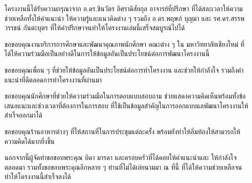\iffalse
\begin{dedication}
This document is dedicated to all Chiang Mai University students.

Dedication page is optional.
\end{dedication}
\fi %

\begin{acknowledgments}
โครงงานนี้ได้รับความกรุณาจาก อ.ดร.ชินวัตร อิศราดิสัยกุล อาจารย์ที่ปรึกษา ที่ได้สละเวลาให้ความช่วยเหลือทั้งให้คำแนะนำ ให้ความรู้และแนวคิดต่าง ๆ รวมถึง อ.ดร.พฤษภ์ บุญมา และ รศ.ดร.สรรพวรรธน์ กันตะบุตร ที่ให้คำปรึกษาจนทำให้โครงงานเล่มนี้เสร็จสมบูรณ์ไปได้
    
ขอขอบคุณงานบริการการศึกษาและพัฒนาคุณภาพนักศึกษา คณะต่าง ๆ ใน มหาวิทยาลัยเชียงใหม่ ที่ได้ให้ความร่วมมือเป็นอย่างดีในการให้ข้อมูลอันเป็นประโยชน์ต่อการพัฒนาโครงงานนี้

ขอขอบคุณเพื่อน ๆ ที่ช่วยให้ข้อมูลอันเป็นประโยชน์ต่อการทำโครงงาน และช่วยให้กำลังใจ รวมถึงคำแนะนำที่ดีตลอดการทำโครงงานที่ผ่านมา

ขอขอบคุณนักศึกษาที่ช่วยให้ความร่วมมือในการตอบแบบสอบถาม ช่วยแสดงความคิดเห็นพร้อมทั้งข้อเสนอแนะและช่วงเวลาที่ต้องการในการสอบ ที่ใช้เป็นข้อมูลสำคัญในการออกแบบแลพัฒนาโครงงานให้สำเร็จออกมาได้

ขอขอบคุณร้านอาหารต่างๆ ที่ให้สถานที่ในการประชุมแต่ละครั้ง พร้อมยังทำให้อิ่มท้องให้สามารถให้ความคิดได้มากยิ่งขึ้น

นอกจากนี้ผู้จัดทำขอขอบพระคุณ บิดา มารดา และครอบครัวที่ได้คอยให้คำแนะนำและ ให้กำลังใจ ตลอดมา รวมทั้งขอขอบพระคุณอีกหลาย ๆ ท่านที่ไม่ได้เอ่ยนามมา ณ ที่นี้ ที่ได้ให้ความช่วยเหลือจนทำให้โครงงานนี้สำเร็จลงได้ 


\end{acknowledgments}%
\fi %

\contentspage

\ifproject
\figurelistpage

\tablelistpage
\fi %



